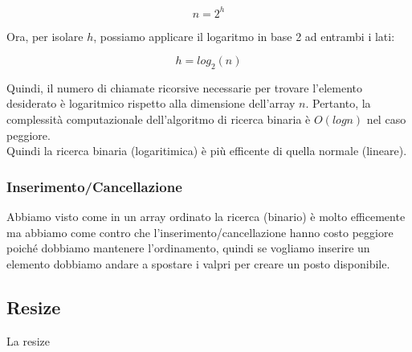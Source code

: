 $$n = 2^h$$

Ora, per isolare $h$, possiamo applicare il logaritmo in base 2 ad entrambi i lati:

$$h = log_2(n)$$

Quindi, il numero di chiamate ricorsive necessarie per trovare l'elemento desiderato è logaritmico rispetto alla dimensione dell'array $n$. Pertanto, la complessità computazionale dell'algoritmo di ricerca binaria è $O(log n)$ nel caso peggiore.\\
Quindi la ricerca binaria (logaritimica) è più efficente di quella normale (lineare).

\subsubsection{Inserimento/Cancellazione}
Abbiamo visto come in un array ordinato la ricerca (binario) è molto efficemente ma abbiamo come contro che l'inserimento/cancellazione hanno costo peggiore poiché dobbiamo mantenere l'ordinamento, quindi se vogliamo inserire un elemento dobbiamo andare a spostare i valpri per creare un posto disponibile.

\subsection{Resize}
La resize 